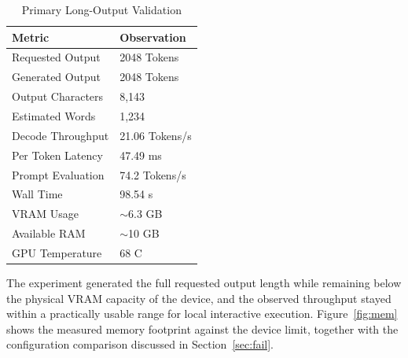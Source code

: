 \documentclass[11pt]{article}
\begin{document}
\begin{table}[h]
\centering
\begin{tabular}{ll}
\toprule
Metric & Observation \\
\midrule
Requested Output & 2048 Tokens \\
Generated Output & 2048 Tokens \\
Output Characters & 8,143 \\
Estimated Words & 1,234 \\
Decode Throughput & 21.06 Tokens/s \\
Per Token Latency & 47.49 ms \\
Prompt Evaluation & 74.2 Tokens/s \\
Wall Time & 98.54 s \\
VRAM Usage & $\sim$6.3 GB \\
Available RAM & $\sim$10 GB \\
GPU Temperature & 68 C \\
\bottomrule
\end{tabular}
\caption{Primary Long-Output Validation}
\end{table}

The experiment generated the full requested output length while remaining below the physical VRAM capacity of the device, and the observed throughput stayed within a practically usable range for local interactive execution. Figure~\ref{fig:mem} shows the measured memory footprint against the device limit, together with the configuration comparison discussed in Section~\ref{sec:fail}.
\end{document}
